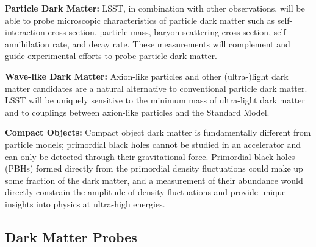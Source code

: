 \documentclass[12pt]{article}
\begin{document}
\noindent \textbf{Particle Dark Matter:} LSST, in combination with other observations, will be able to probe microscopic characteristics of particle dark matter such as self-interaction cross section, particle mass, baryon-scattering cross section, self-annihilation rate, and decay rate. These measurements will complement and guide experimental efforts to probe particle dark matter.


\noindent \textbf{Wave-like Dark Matter:} Axion-like particles and other (ultra-)light dark matter candidates are a natural alternative to conventional particle dark matter. LSST will be uniquely sensitive to the minimum mass of ultra-light dark matter and to couplings between axion-like particles and the Standard Model.

\noindent \textbf{Compact Objects:} Compact object dark matter is fundamentally different from particle models; primordial black holes cannot be studied in an accelerator and can only be detected through their gravitational force. 
Primordial black holes (PBHs) formed directly from the primordial density fluctuations could make up some fraction of the dark matter, and a measurement of their abundance would directly constrain the amplitude of density fluctuations and provide unique insights into physics at ultra-high energies.


\subsection*{Dark Matter Probes} 
\end{document}
